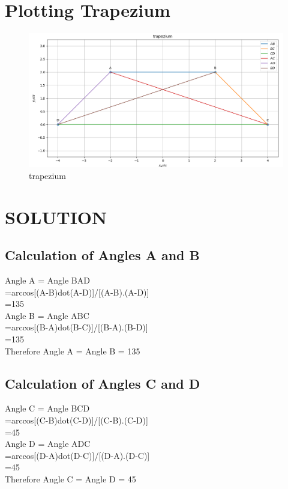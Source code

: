 \documentclass[conference]{IEEEtran}
\begin{document}
\section{Plotting Trapezium}
\vspace{1cm}

\begin{figure}[h]
\centering
\includegraphics[width=1\columnwidth]{trapezium.png}
\caption{trapezium}
\label{fig:trapezium}
\end{figure}


\vspace{4cm}

\section{SOLUTION}
\vspace{0.25cm}
\subsection{Calculation of Angles A and B}
\begin{flushleft}

Angle A = Angle BAD \\
=arccos[(A-B)dot(A-D)]/[(A-B).(A-D)]\\
=135 \\

Angle B = Angle ABC \\
=arccos[(B-A)dot(B-C)]/[(B-A).(B-D)]\\
=135\\
Therefore Angle A = Angle B = 135\\
\end{flushleft}
\vspace{0.25cm}
\subsection{Calculation of Angles C and D}
\begin{flushleft}

Angle C = Angle BCD \\
=arccos[(C-B)dot(C-D)]/[(C-B).(C-D)]\\
=45 \\

Angle D = Angle ADC \\
=arccos[(D-A)dot(D-C)]/[(D-A).(D-C)]\\
=45\\
Therefore Angle C = Angle D = 45\\
\end{flushleft}
\vspace{0.25cm}
\end{document}
